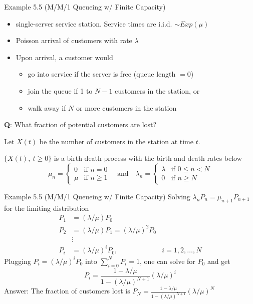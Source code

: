 \documentclass[letterpaper]{beamer}
\begin{document}
\begin{frame}{Example 5.5 (M/M/1 Queueing w/ Finite Capacity)}
\begin{itemize}
\item single-server service station. Service times are i.i.d. $\sim Exp(\mu)$
\item Poisson arrival of customers with rate $\lambda$
\item Upon arrival, a customer would
\begin{itemize}\normalsize
\item go into service if the server is free (queue length $=0$)
\item join the queue if 1 to $N-1$ customers in the station, or
\item \alert{walk away} if $N$ or more customers in the station
\end{itemize}
\end{itemize}
{\bf Q}: What fraction of potential customers are lost?\par\medskip

Let $X(t)$ be the number of customers in the station at time $t$. \smallskip

$\{X(t), ~t\ge 0\}$ is a birth-death process with the birth and death rates below
$$
\mu_n=
\begin{cases}
0   & \text{if }n = 0\\
\mu & \text{if }n\ge 1
\end{cases}\quad\text{and}\quad
\lambda_n =
\begin{cases}
\lambda&\text{if $0\le n<N$}\\
0& \text{if }n\ge N
\end{cases}
$$\end{frame}
\begin{frame}{Example 5.5 (M/M/1 Queueing w/ Finite Capacity)}
Solving $\lambda_n P_n= \mu_{n+1}P_{n+1}$ for the limiting distribution
\begin{align*}
P_1&=(\lambda/\mu)P_0\\
P_2&=(\lambda/\mu)P_1=(\lambda/\mu)^2P_0\\
&\vdots\\
P_i&=(\lambda/\mu)^iP_0, & i=1,2,\ldots,N
\end{align*}
Plugging $P_i=(\lambda/\mu)^iP_0$ into $\sum_{i=0}^N P_i=1$, one can solve for $P_0$ and get
$$
P_i=\frac{1-\lambda/\mu}{1-(\lambda/\mu)^{N+1}}(\lambda/\mu)^{i}
$$
Answer: The fraction of customers lost is $P_N=\frac{1-\lambda/\mu}{1-(\lambda/\mu)^{N+1}}(\lambda/\mu)^{N}$
\end{frame}
\end{document}
